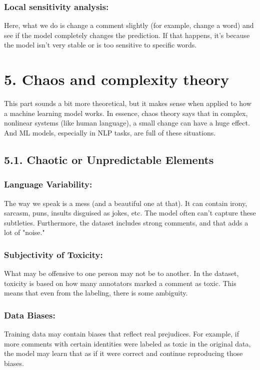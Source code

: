 \documentclass[a4paper,12pt]{article}
\begin{document}
\subsubsection*{Local sensitivity analysis:}
Here, what we do is change a comment slightly (for example, change a word) and see if the model completely changes the prediction. If that happens, it's because the model isn't very stable or is too sensitive to specific words.

\section*{5. Chaos and complexity theory}

This part sounds a bit more theoretical, but it makes sense when applied to how a machine learning model works.
In essence, chaos theory says that in complex, nonlinear systems (like human language), a small change can have a huge effect. And ML models, especially in NLP tasks, are full of these situations.

\subsection*{5.1. Chaotic or Unpredictable Elements}

\subsubsection*{Language Variability:}
The way we speak is a mess (and a beautiful one at that). It can contain irony, sarcasm, puns, insults disguised as jokes, etc. The model often can't capture these subtleties. Furthermore, the dataset includes strong comments, and that adds a lot of "noise."

\subsubsection*{Subjectivity of Toxicity:}
What may be offensive to one person may not be to another. In the dataset, toxicity is based on how many annotators marked a comment as toxic. This means that even from the labeling, there is some ambiguity.

\subsubsection*{Data Biases:}
Training data may contain biases that reflect real prejudices. For example, if more comments with certain identities were labeled as toxic in the original data, the model may learn that as if it were correct and continue reproducing those biases.
\end{document}
